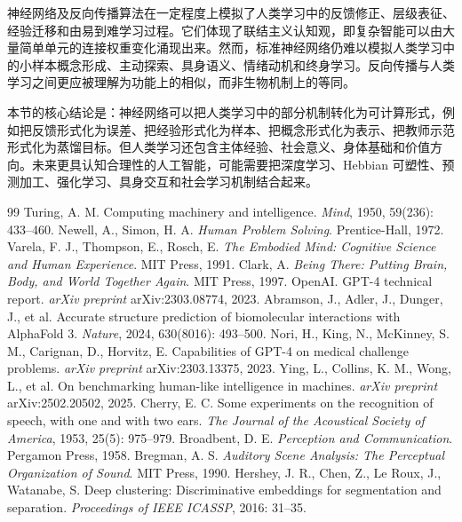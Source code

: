 \documentclass[UTF8,zihao=5,a4paper]{ctexart}
\begin{document}
神经网络及反向传播算法在一定程度上模拟了人类学习中的反馈修正、层级表征、经验迁移和由易到难学习过程。它们体现了联结主义认知观，即复杂智能可以由大量简单单元的连接权重变化涌现出来。然而，标准神经网络仍难以模拟人类学习中的小样本概念形成、主动探索、具身语义、情绪动机和终身学习。反向传播与人类学习之间更应被理解为功能上的相似，而非生物机制上的等同。

本节的核心结论是：神经网络可以把人类学习中的部分机制转化为可计算形式，例如把反馈形式化为误差、把经验形式化为样本、把概念形式化为表示、把教师示范形式化为蒸馏目标。但人类学习还包含主体经验、社会意义、身体基础和价值方向。未来更具认知合理性的人工智能，可能需要把深度学习、Hebbian 可塑性、预测加工、强化学习、具身交互和社会学习机制结合起来。

\begingroup
{}\songti
\begin{thebibliography}{99}
 Turing, A. M. Computing machinery and intelligence. \textit{Mind}, 1950, 59(236): 433--460.
 Newell, A., Simon, H. A. \textit{Human Problem Solving}. Prentice-Hall, 1972.
 Varela, F. J., Thompson, E., Rosch, E. \textit{The Embodied Mind: Cognitive Science and Human Experience}. MIT Press, 1991.
 Clark, A. \textit{Being There: Putting Brain, Body, and World Together Again}. MIT Press, 1997.
 OpenAI. GPT-4 technical report. \textit{arXiv preprint} arXiv:2303.08774, 2023.
 Abramson, J., Adler, J., Dunger, J., et al. Accurate structure prediction of biomolecular interactions with AlphaFold 3. \textit{Nature}, 2024, 630(8016): 493--500.
 Nori, H., King, N., McKinney, S. M., Carignan, D., Horvitz, E. Capabilities of GPT-4 on medical challenge problems. \textit{arXiv preprint} arXiv:2303.13375, 2023.
 Ying, L., Collins, K. M., Wong, L., et al. On benchmarking human-like intelligence in machines. \textit{arXiv preprint} arXiv:2502.20502, 2025.
 Cherry, E. C. Some experiments on the recognition of speech, with one and with two ears. \textit{The Journal of the Acoustical Society of America}, 1953, 25(5): 975--979.
 Broadbent, D. E. \textit{Perception and Communication}. Pergamon Press, 1958.
 Bregman, A. S. \textit{Auditory Scene Analysis: The Perceptual Organization of Sound}. MIT Press, 1990.
 Hershey, J. R., Chen, Z., Le Roux, J., Watanabe, S. Deep clustering: Discriminative embeddings for segmentation and separation. \textit{Proceedings of IEEE ICASSP}, 2016: 31--35.

\end{thebibliography}
\end{document}
